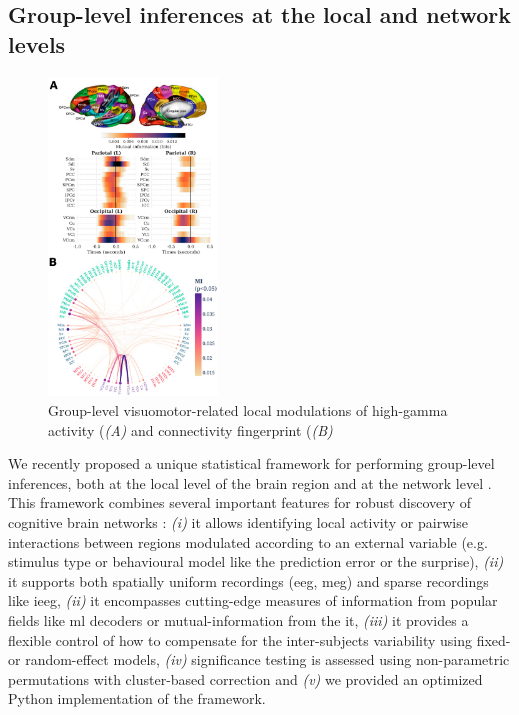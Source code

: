 \documentclass[a4paper,11pt]{article}
\begin{document}


\subsection{Group-level inferences at the local and network levels}

\begin{figure} %
    \centering
    \includegraphics[width=0.40\textwidth]{figures/report/combrisson_2022_group_level_col.png}
    \caption{Group-level visuomotor-related local modulations of high-gamma activity (\textit{(A)} and connectivity fingerprint (\textit{(B)}}
    \label{fig_group_level}
\end{figure}

We recently proposed a unique statistical framework for performing group-level inferences, both at the local level of the brain region and at the network level \citep{combrisson2022grouplevel}. This framework combines several important features for robust discovery of cognitive brain networks : \textit{(i)} it allows identifying local activity or pairwise interactions between regions modulated according to an external variable (e.g. stimulus type or behavioural model like the prediction error or the surprise), \textit{(ii)} it supports both spatially uniform recordings (\ac{eeg}, \ac{meg}) and sparse recordings like \ac{ieeg}, \textit{(ii)} it encompasses cutting-edge measures of information from popular fields like \ac{ml} decoders or mutual-information from the \ac{it}, \textit{(iii)} it provides a flexible control of how to compensate for the inter-subjects variability using fixed- or random-effect models, \textit{(iv)} significance testing is assessed using non-parametric permutations with cluster-based correction and \textit{(v)} we provided an optimized Python implementation of the framework.
\end{document}
